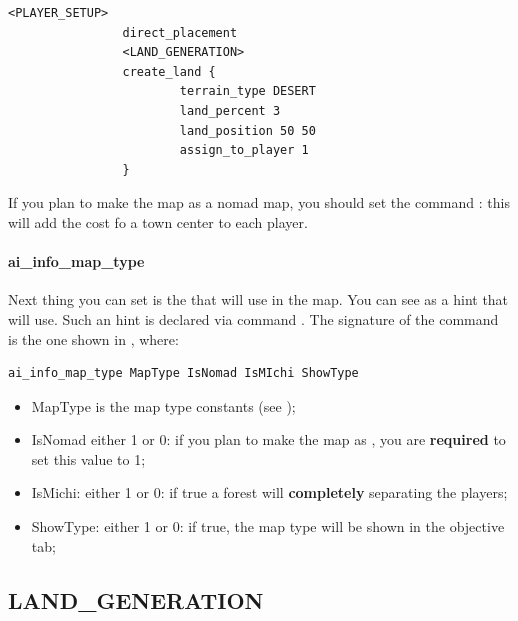 \begin{appendices}
\begin{itemize}
            \begin{lstlisting}[language=rms,label=rms:manualposition]
                <PLAYER_SETUP>
                direct_placement
                <LAND_GENERATION>
                create_land {
                        terrain_type DESERT
                        land_percent 3
                        land_position 50 50
                        assign_to_player 1
                }
            \end{lstlisting}
        
    \end{itemize}

    If you plan to make the map as a nomad map, you should set the command : this will add the cost fo a town center to each player.

    \paragraph{ai\_info\_map\_type}

    Next thing you can set is the  that \aoe{} will use in the map. You can see as a hint that \aoe{} will use. Such an hint is declared via command . The signature of the command is the one shown in , where:

    \begin{lstlisting}[language=rms,label=rms:setai]
        ai_info_map_type MapType IsNomad IsMIchi ShowType
    \end{lstlisting}

    \begin{itemize}
        \item MapType is the map type constants (see );
        \item IsNomad either 1 or 0: if you plan to make the map as , you are \textbf{required} to set this value to 1;
        \item IsMichi: either 1 or 0: if true a forest will \textbf{completely} separating the players;
        \item ShowType: either 1 or 0: if true, the map type will be shown in the objective tab;
    \end{itemize}

    \subsection{LAND\_GENERATION}


\end{appendices}
